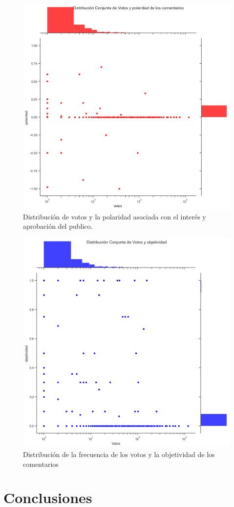 \begin{figure}[!h]
	\centering
	\includegraphics[width=16cm]{../Datos/DisVotosPolaridad}
	\caption[Distribución de frecuencia de voto y su polaridad]{Distribución de votos y la polaridad asociada con el interés y aprobación del publico.}
	\label{fig:dvp}
\end{figure}


\begin{figure}[!h]
	\centering
	\includegraphics[width=16cm]{../Datos/DisVotosObjetividad}
	\caption[Distribución de frecuencia de voto y objetividad]{Distribución de la frecuencia de los votos y la objetividad de los comentarios}
	\label{fig:dvo}
\end{figure}


\chapter{Conclusiones}

